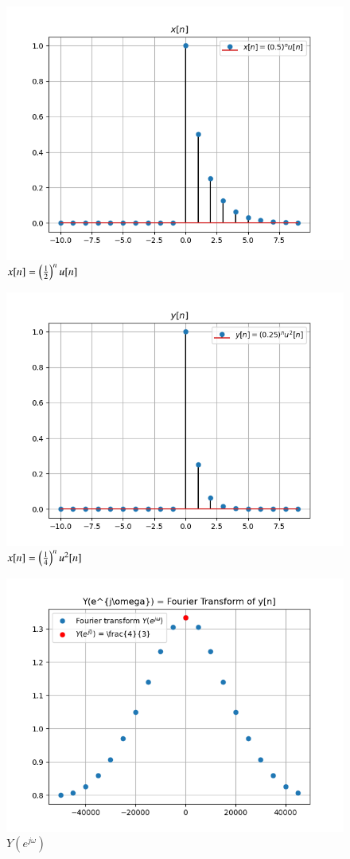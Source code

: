 \documentclass[journal,12pt,twocolumn]{IEEEtran}
\begin{document}
\begin{figure}[!ht]
\centering
 \includegraphics[width=\columnwidth]{graphs/x_n.png}
 \caption{$x[n] = \left(\frac{1}{2}\right)^nu[n]$}
 \end{figure}
 
 \begin{figure}[!ht]
\centering
 \includegraphics[width=\columnwidth]{graphs/y_n.png}
 \caption{$x[n] = \left(\frac{1}{4}\right)^nu^2[n]$}
 \end{figure}
 
 \begin{figure}[!ht]
\centering
 \includegraphics[width=\columnwidth]{graphs/Fourier_transform.png}
 \caption{$Y(e^{j\omega})$}
 \end{figure}
\end{document}
